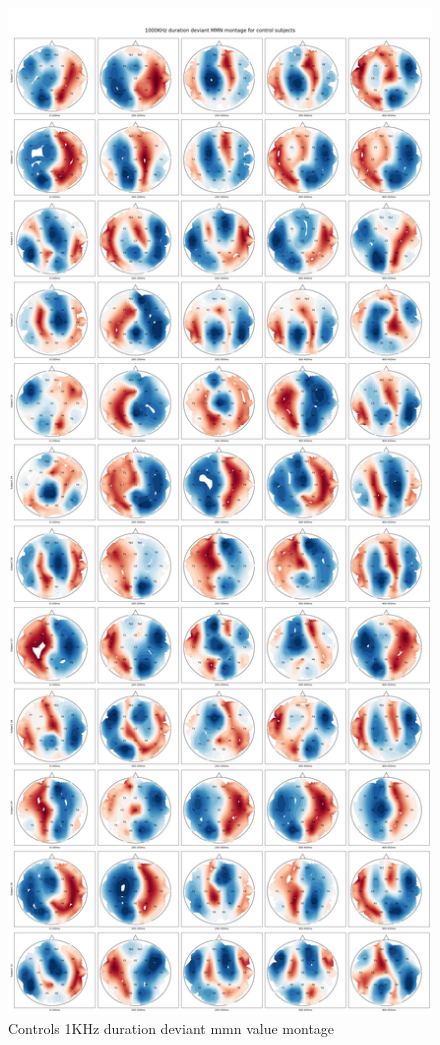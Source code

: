 \documentclass[10pt]{article}
\begin{document}
\begin{figure}[H]
  \includegraphics[width=16cm]{../../../data_analysis_results/MMN/montage/Control/1KHz_duration_deviant_montage.png}
  \caption{Controls 1KHz duration deviant \gls{mmn} value montage}\label{control_1KHz_mmn_montage}
\end{figure}
\end{document}
